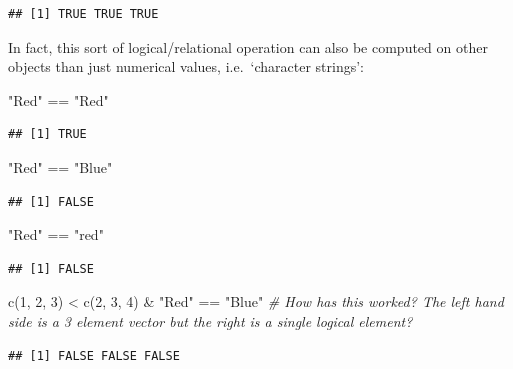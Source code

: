 \documentclass[
]{book}
\newenvironment{Shaded}{\begin{snugshade}}{\end{snugshade}}
\newcommand{\CommentTok}[1]{\textcolor[rgb]{0.56,0.35,0.01}{\textit{#1}}}
\newcommand{\DecValTok}[1]{\textcolor[rgb]{0.00,0.00,0.81}{#1}}
\newcommand{\FunctionTok}[1]{\textcolor[rgb]{0.00,0.00,0.00}{#1}}
\newcommand{\NormalTok}[1]{#1}
\newcommand{\SpecialCharTok}[1]{\textcolor[rgb]{0.00,0.00,0.00}{#1}}
\newcommand{\StringTok}[1]{\textcolor[rgb]{0.31,0.60,0.02}{#1}}
\theoremstyle{definition}
\theoremstyle{definition}
\theoremstyle{definition}
\theoremstyle{definition}
\theoremstyle{remark}
\begin{document}
\begin{verbatim}
## [1] TRUE TRUE TRUE
\end{verbatim}

In fact, this sort of logical/relational operation can also be computed on other objects than just numerical values, i.e.~`character strings':

\begin{Shaded}
\begin{Highlighting}[]
\StringTok{"Red"} \SpecialCharTok{==} \StringTok{"Red"}
\end{Highlighting}
\end{Shaded}

\begin{verbatim}
## [1] TRUE
\end{verbatim}

\begin{Shaded}
\begin{Highlighting}[]
\StringTok{"Red"} \SpecialCharTok{==} \StringTok{"Blue"}
\end{Highlighting}
\end{Shaded}

\begin{verbatim}
## [1] FALSE
\end{verbatim}

\begin{Shaded}
\begin{Highlighting}[]
\StringTok{"Red"} \SpecialCharTok{==} \StringTok{"red"}
\end{Highlighting}
\end{Shaded}

\begin{verbatim}
## [1] FALSE
\end{verbatim}

\begin{Shaded}
\begin{Highlighting}[]
\FunctionTok{c}\NormalTok{(}\DecValTok{1}\NormalTok{, }\DecValTok{2}\NormalTok{, }\DecValTok{3}\NormalTok{) }\SpecialCharTok{\textless{}} \FunctionTok{c}\NormalTok{(}\DecValTok{2}\NormalTok{, }\DecValTok{3}\NormalTok{, }\DecValTok{4}\NormalTok{) }\SpecialCharTok{\&} \StringTok{"Red"} \SpecialCharTok{==} \StringTok{"Blue"} \CommentTok{\# How has this worked? The left hand side is a 3 element vector but the right is a single logical element?}
\end{Highlighting}
\end{Shaded}

\begin{verbatim}
## [1] FALSE FALSE FALSE
\end{verbatim}
\end{document}
